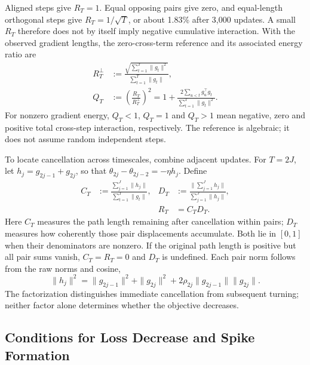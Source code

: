 Aligned steps give $R_T=1$. Equal opposing pairs give zero, and
equal-length orthogonal steps give $R_T=1/\sqrt T$, or about 1.83\%
after 3,000 updates. A small $R_T$ therefore does not by itself imply
negative cumulative interaction. With the observed gradient lengths,
the zero-cross-term reference and its associated energy ratio are
\begin{equation}
\begin{aligned}
 R_T^{\perp}&:=\frac{\sqrt{\sum_{t=1}^T\|g_t\|^2}}
                         {\sum_{t=1}^T\|g_t\|},\\
 Q_T&:=\left(\frac{R_T}{R_T^{\perp}}\right)^2
 =1+\frac{2\sum_{u<t}g_u^\top g_t}{\sum_{t=1}^T\|g_t\|^2}.
\end{aligned}
\label{eq:zero-interaction-reference}
\end{equation}
For nonzero gradient energy, $Q_T<1$, $Q_T=1$ and $Q_T>1$ mean
negative, zero and positive total cross-step interaction, respectively.
The reference is algebraic; it does not assume random independent steps.

To locate cancellation across timescales, combine adjacent updates.
For $T=2J$, let $h_j=g_{2j-1}+g_{2j}$, so that
$\theta_{2j}-\theta_{2j-2}=-\eta h_j$. Define
\begin{equation}
\begin{aligned}
 C_T&:=\frac{\sum_{j=1}^J\|h_j\|}{\sum_{t=1}^T\|g_t\|},
 &D_T&:=\frac{\|\sum_{j=1}^Jh_j\|}{\sum_{j=1}^J\|h_j\|},\\
 &&R_T&=C_TD_T.
\end{aligned}
\label{eq:paired-displacement}
\end{equation}
Here $C_T$ measures the path length remaining after cancellation within
pairs; $D_T$ measures how coherently those pair displacements accumulate.
Both lie in $[0,1]$ when their denominators are nonzero. If the original
path length is positive but all pair sums vanish, $C_T=R_T=0$ and $D_T$
is undefined. Each pair norm follows from
the raw norms and cosine,
\begin{equation}
 \|h_j\|^2=\|g_{2j-1}\|^2+\|g_{2j}\|^2
       +2\rho_{2j}\|g_{2j-1}\|\|g_{2j}\|.
 \label{eq:pair-norm}
\end{equation}
The factorization distinguishes immediate cancellation from subsequent
turning; neither factor alone determines whether the objective decreases.



\subsection{Conditions for Loss Decrease and Spike Formation}
\label{subsec:loss-connection}

